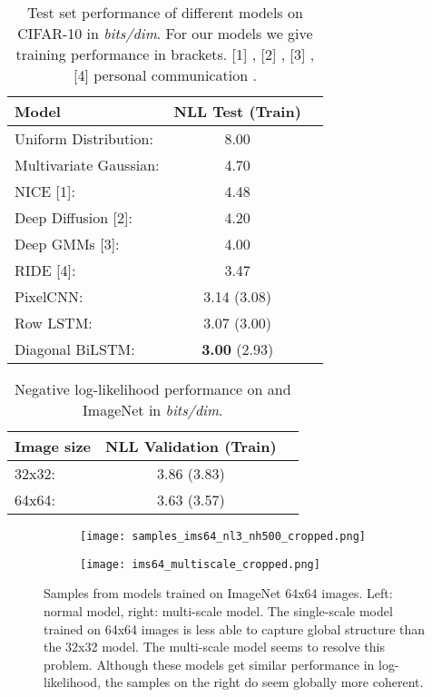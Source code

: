 \documentclass{article}
\begin{document}
\begin{table}[!h]
\centering
	\begin{tabular}{lcc}
		\toprule
		\textbf{Model} & \textbf{NLL Test (Train)}  \\ 
		\midrule
		Uniform Distribution: & 8.00 \\ 
		Multivariate Gaussian: & 4.70 \\ 
		NICE [1]: & 4.48 \\ 
		Deep Diffusion [2]: & 4.20 \\ 
		Deep GMMs [3]: & 4.00 \\
		RIDE [4]: & 3.47 \\ 
		\midrule
		PixelCNN: & 3.14 (3.08) \\ 
		Row LSTM: & 3.07 (3.00) \\ 
		Diagonal BiLSTM: \quad\quad\quad\quad\quad\quad\quad & \textbf{3.00} (2.93) \\ 
	    \bottomrule
	\end{tabular}
\caption{Test set performance of different models on CIFAR-10 in \emph{bits/dim}. For our models we give training performance in brackets. [1] \cite{dinh2014nice}, [2] \cite{deepdiffusion}, [3] \cite{van2014factoring}, [4] personal communication \cite{theis2015generative}.}
\label{table:cifar10}
\end{table}

\begin{table}[!h]
	\begin{center}
	\begin{tabular}{lcc}
		\toprule
		\textbf{Image size} & \textbf{NLL Validation (Train)}  \\ 
		\midrule
		32x32: & 3.86 (3.83) \\ 
		64x64: & 3.63 (3.57) \\ 
	    \bottomrule
	\end{tabular}
	\end{center}
\vspace{-0.2cm}
\caption{Negative log-likelihood performance on  and  ImageNet in \emph{bits/dim}.}
\label{table:imagenet}
\vspace{-0.4cm}
\end{table}


\begin{figure*}[ht]

\begin{subfigure}{.5\textwidth}
  \centering
\texttt{[image: samples\_ims64\_nl3\_nh500\_cropped.png]}
\end{subfigure}\hfill
\begin{subfigure}{.5\textwidth}
  \centering
\texttt{[image: ims64\_multiscale\_cropped.png]}
\end{subfigure}\hfill
\caption{Samples from models trained on ImageNet 64x64 images. Left: normal model, right: multi-scale model. The single-scale model trained on 64x64 images is less able to capture global structure than the 32x32 model. The multi-scale model seems to resolve this problem. Although these models get similar performance in log-likelihood, the samples on the right do seem globally more coherent.}
\label{fig:samples_64}
\end{figure*}
\end{document}
